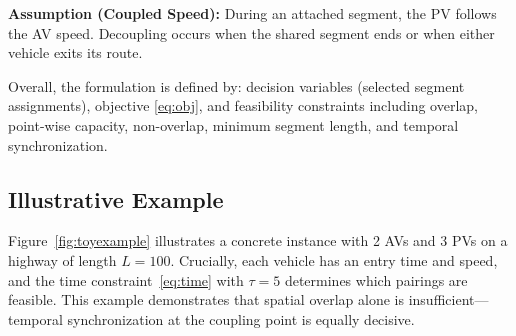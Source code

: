 \documentclass[conference]{IEEEtran}
\begin{document}
\textbf{Assumption (Coupled Speed):} During an attached segment, the PV follows the AV speed. Decoupling occurs when the shared segment ends or when either vehicle exits its route.

Overall, the formulation is defined by: decision variables (selected segment assignments), objective \eqref{eq:obj}, and feasibility constraints including overlap, point-wise capacity, non-overlap, minimum segment length, and temporal synchronization.

\subsection{Illustrative Example}
\label{sec:toyexample}

Figure~\ref{fig:toyexample} illustrates a concrete instance with 2 AVs and 3 PVs on a highway of length $L = 100$. Crucially, each vehicle has an entry time and speed, and the time constraint~\eqref{eq:time} with $\tau = 5$ determines which pairings are feasible. This example demonstrates that spatial overlap alone is insufficient---temporal synchronization at the coupling point is equally decisive.
\end{document}
